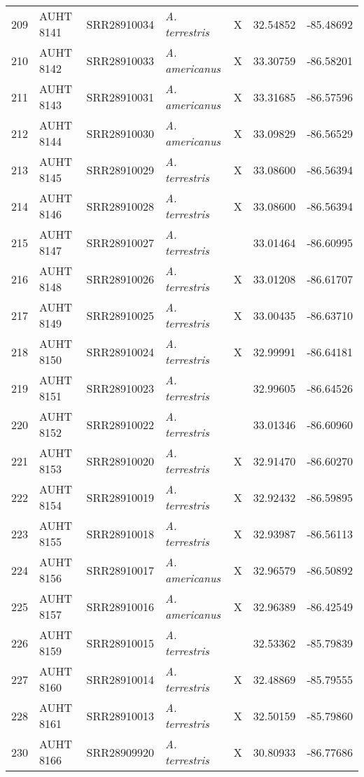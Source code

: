 \begin{longtable}{ lllllll }
209 & AUHT 8141 & SRR28910034 & \textit{A. terrestris} & X & 32.54852 & -85.48692 \\ 
210 & AUHT 8142 & SRR28910033 & \textit{A. americanus} & X & 33.30759 & -86.58201 \\ 
211 & AUHT 8143 & SRR28910031 & \textit{A. americanus} & X & 33.31685 & -86.57596 \\ 
212 & AUHT 8144 & SRR28910030 & \textit{A. americanus} & X & 33.09829 & -86.56529 \\ 
213 & AUHT 8145 & SRR28910029 & \textit{A. terrestris} & X & 33.08600 & -86.56394 \\ 
214 & AUHT 8146 & SRR28910028 & \textit{A. terrestris} & X & 33.08600 & -86.56394 \\ 
215 & AUHT 8147 & SRR28910027 & \textit{A. terrestris} &  & 33.01464 & -86.60995 \\ 
216 & AUHT 8148 & SRR28910026 & \textit{A. terrestris} & X & 33.01208 & -86.61707 \\ 
217 & AUHT 8149 & SRR28910025 & \textit{A. terrestris} & X & 33.00435 & -86.63710 \\ 
218 & AUHT 8150 & SRR28910024 & \textit{A. terrestris} & X & 32.99991 & -86.64181 \\ 
219 & AUHT 8151 & SRR28910023 & \textit{A. terrestris} &  & 32.99605 & -86.64526 \\ 
220 & AUHT 8152 & SRR28910022 & \textit{A. terrestris} &  & 33.01346 & -86.60960 \\ 
221 & AUHT 8153 & SRR28910020 & \textit{A. terrestris} & X & 32.91470 & -86.60270 \\ 
222 & AUHT 8154 & SRR28910019 & \textit{A. terrestris} & X & 32.92432 & -86.59895 \\ 
223 & AUHT 8155 & SRR28910018 & \textit{A. terrestris} & X & 32.93987 & -86.56113 \\ 
224 & AUHT 8156 & SRR28910017 & \textit{A. americanus} & X & 32.96579 & -86.50892 \\ 
225 & AUHT 8157 & SRR28910016 & \textit{A. americanus} & X & 32.96389 & -86.42549 \\ 
226 & AUHT 8159 & SRR28910015 & \textit{A. terrestris} &  & 32.53362 & -85.79839 \\ 
227 & AUHT 8160 & SRR28910014 & \textit{A. terrestris} & X & 32.48869 & -85.79555 \\ 
228 & AUHT 8161 & SRR28910013 & \textit{A. terrestris} & X & 32.50159 & -85.79860 \\ 
230 & AUHT 8166 & SRR28909920 & \textit{A. terrestris} & X & 30.80933 & -86.77686 \\ 

\end{longtable}
